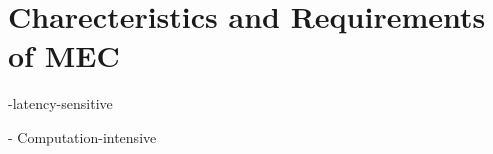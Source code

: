 \section{Charecteristics and Requirements of MEC}  \label{requirements}

-latency-sensitive

- Computation-intensive
